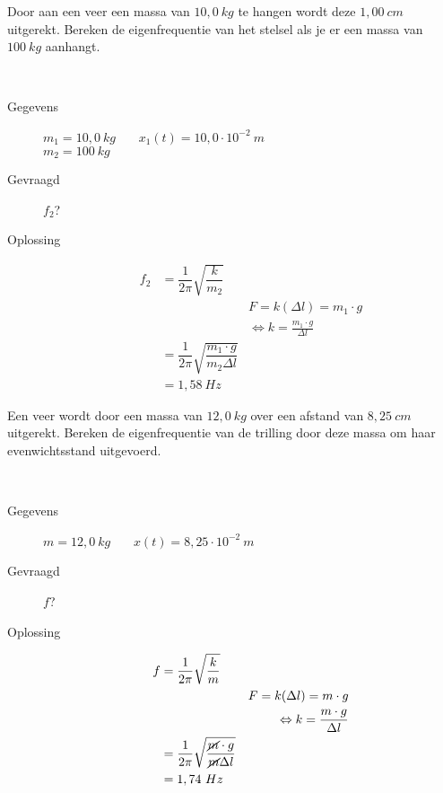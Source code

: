 \documentclass{ximera}
\begin{document}
    \begin{exercise} 
        Door aan een veer een massa van $10,0 \ kg$ te hangen wordt deze $1,00 \ cm$ uitgerekt. Bereken de eigenfrequentie van het stelsel als je er een massa van $100 \ kg$ aanhangt.
         \begin{oplossing} \ \\
            \begin{description}
                \item [Gegevens] $m_1=10,0 \ kg$ \ \ \ $x_1(t)=10,0\cdot 10^{-2} \ m$ \\
                $m_2=100 \ kg$
                \item [Gevraagd] $f_2$?
                \item [Oplossing] 
                \begin{align*}
                    f_2&=\dfrac{1}{2\pi}\sqrt{\dfrac{k}{m_2}}\\
                    && F=k(\Delta l)=m_1\cdot g \\
                    && \Leftrightarrow k=\frac{m_1\cdot g}{\Delta l} \\
                    &=\dfrac{1}{2\pi}\sqrt{\dfrac{m_1\cdot g}{m_2\Delta l}}\\
                    &=1,58 \ Hz
                \end{align*}
            \end{description}
        \end{oplossing}
    \end{exercise}
    
    \begin{exercise} 
        Een veer wordt door een massa van $12,0 \ kg$ over een afstand van $8,25 \ cm$ uitgerekt. Bereken de eigenfrequentie van de trilling door deze massa om haar evenwichtsstand uitgevoerd.
         \begin{oplossing} \ \\
            \begin{description}
                \item [Gegevens] $m=12,0 \ kg$ \ \ \ $x(t)=8,25\cdot 10^{-2} \ m$
                \item [Gevraagd] $f$?
                \item [Oplossing] 
                \begin{align*}
                    f&=\dfrac{1}{2\pi}\sqrt{\dfrac{k}{m}}\\
                    && F=k(\Delta l)=m\cdot g \\
                    && \Leftrightarrow k=\frac{m\cdot g}{\Delta l} \\
                    &=\dfrac{1}{2\pi}\sqrt{\dfrac{\cancel{m}\cdot g}{\cancel{m}\Delta l}}\\
                    &=1,74 \ Hz
                \end{align*}
            \end{description}
        \end{oplossing}
    \end{exercise}
    
\end{document}
